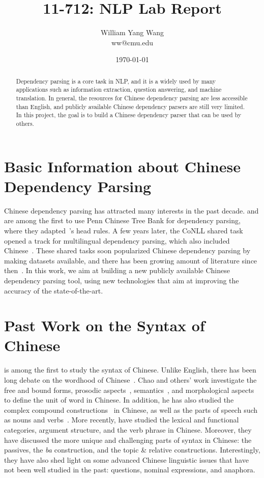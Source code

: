 \documentclass[11pt,letterpaper]{article}
\title{11-712:  NLP Lab Report}
\author{William Yang Wang\\
ww@cmu.edu}
\date{\today}
\begin{document}
\maketitle
\begin{abstract}
Dependency parsing is a core task in NLP, and it is a widely used by many applications such as information extraction,
question answering, and machine translation. In general, the resources for Chinese dependency parsing are less accessible than English, and publicly available Chinese dependency parsers are still very limited. In this project, the goal is to build a Chinese dependency parser that can be used by others.
\end{abstract}

\section{Basic Information about Chinese Dependency Parsing}
\label{sec:info}
Chinese dependency parsing has attracted many interests in the past decade.
\cite{bikel2000two} and \citet{Chiang:2002} are among the first to use Penn Chinese Tree Bank for dependency parsing,
where they adapted~\cite{xia1999extracting}'s head rules.
A few years later, the CoNLL shared task opened a track for multilingual dependency parsing,
which also included Chinese~\citep{buchholz2006conll,nilsson2007conll}.
These shared tasks soon popularized Chinese dependency parsing by making datasets available,
and there has been growing amount of literature since then~\citep{zhang2008tale,nivre2007maltparser,sagae2007dependency,
che2010ltp,carreras2007experiments,duan2007probabilistic}.
In this work, we aim at building a new publicly available Chinese dependency parsing tool, using 
new technologies that aim at improving the accuracy of the state-of-the-art.

\section{Past Work on the Syntax of Chinese}
\cite{chao1968grammar} is among the first to study the syntax of Chinese. Unlike 
English, there has been long debate on the wordhood of Chinese~\citep{duanmu1998wordhood}.
Chao and others' work investigate the free and bound forms,
prosodic aspects~\citep{shen1990prosody}, semantics~\cite{li1972semantics,wu1999syntax}, and morphological aspects~\citep{tang1989studies,dai1992chinese,sproat2002corpus} to define the unit of word in Chinese.
In addition, he has also studied the complex compound constructions~\citep{zhou1999morphology,zhang2000extraction} in Chinese,
as well as the parts of speech such as nouns and verbs~\citep{krifka1995common}.
More recently, \cite{huang2009syntax} have studied
the lexical and functional categories,
argument structure, and the verb phrase in Chinese.
Moreover, they have discussed the more unique and challenging parts
of syntax in Chinese: the passives, the \emph{ba} construction,
and the topic \& relative constructions.
Interestingly, they have also shed light on some advanced Chinese linguistic issues 
that have not been well studied in the past: 
questions, nominal expressions, and anaphora.
\end{document}
